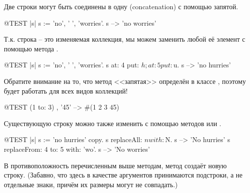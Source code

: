 \documentclass[a4paper,10pt,twoside]{book}
\begin{document}
Две строки могут быть соединены в одну (concatenation) с помощью запятой.
\begin{code}{@TEST |s|}
s := 'no', ' ', 'worries'.
s -->  'no worries'
\end{code}

Т.к. строка -- это изменяемая коллекция, мы можем заменить любой её элемент с помощью метода .

\begin{code}{@TEST |s| s := 'no', ' ', 'worries'.}
s at: 4 put: $h; at: 5 put: $u.
s --> 'no hurries'
\end{code}

Обратите внимание на то, что метод <<запятая>> определён в классе , поэтому будет работать для всех видов коллекций!
\begin{code}{@TEST}
(1 to: 3) , '45' --> #(1 2 3 $4 $5)
\end{code}

Существующую строку можно также изменить с помощью методов  или .

\begin{code}{@TEST |s| s := 'no hurries' copy.}
s replaceAll: $n with: $N.
s --> 'No hurries'
s replaceFrom: 4 to: 5 with: 'wo'.
s --> 'No worries'
\end{code}

В противоположность перечисленным выше методам, метод  создаёт новую строку.
(Забавно, что здесь в качестве аргументов принимаются подстроки, а не отдельные знаки, причём их размеры могут не совпадать.)
\end{document}
